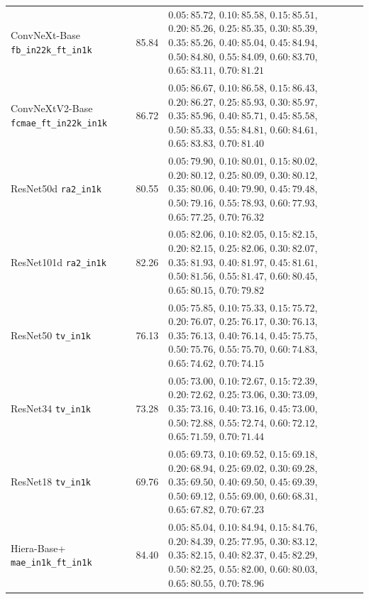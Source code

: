 \documentclass[11pt]{article}
\theoremstyle{plain}
\theoremstyle{definition}
\theoremstyle{remark}
\newcommand{\1}{\mathbf{1}}
\begin{document}
\begin{table}[ht]
\begin{tabularx}{\textwidth}{p{4.0cm}cX}
ConvNeXt-Base \texttt{fb\_in22k\_ft\_in1k}
& 85.84
& \(0.05:85.72\), \(0.10:85.58\), \(0.15:85.51\), \(0.20:85.26\), \(0.25:85.35\), \(0.30:85.39\), \(0.35:85.26\), \(0.40:85.04\), \(0.45:84.94\), \(0.50:84.80\), \(0.55:84.09\), \(0.60:83.70\), \(0.65:83.11\), \(0.70:81.21\) \\
ConvNeXtV2-Base \texttt{fcmae\_ft\_in22k\_in1k}
& 86.72
& \(0.05:86.67\), \(0.10:86.58\), \(0.15:86.43\), \(0.20:86.27\), \(0.25:85.93\), \(0.30:85.97\), \(0.35:85.96\), \(0.40:85.71\), \(0.45:85.58\), \(0.50:85.33\), \(0.55:84.81\), \(0.60:84.61\), \(0.65:83.83\), \(0.70:81.40\) \\
ResNet50d \texttt{ra2\_in1k}
& 80.55
& \(0.05:79.90\), \(0.10:80.01\), \(0.15:80.02\), \(0.20:80.12\), \(0.25:80.09\), \(0.30:80.12\), \(0.35:80.06\), \(0.40:79.90\), \(0.45:79.48\), \(0.50:79.16\), \(0.55:78.93\), \(0.60:77.93\), \(0.65:77.25\), \(0.70:76.32\) \\
ResNet101d \texttt{ra2\_in1k}
& 82.26
& \(0.05:82.06\), \(0.10:82.05\), \(0.15:82.15\), \(0.20:82.15\), \(0.25:82.06\), \(0.30:82.07\), \(0.35:81.93\), \(0.40:81.97\), \(0.45:81.61\), \(0.50:81.56\), \(0.55:81.47\), \(0.60:80.45\), \(0.65:80.15\), \(0.70:79.82\) \\
ResNet50 \texttt{tv\_in1k}
& 76.13
& \(0.05:75.85\), \(0.10:75.33\), \(0.15:75.72\), \(0.20:76.07\), \(0.25:76.17\), \(0.30:76.13\), \(0.35:76.13\), \(0.40:76.14\), \(0.45:75.75\), \(0.50:75.76\), \(0.55:75.70\), \(0.60:74.83\), \(0.65:74.62\), \(0.70:74.15\) \\
ResNet34 \texttt{tv\_in1k}
& 73.28
& \(0.05:73.00\), \(0.10:72.67\), \(0.15:72.39\), \(0.20:72.62\), \(0.25:73.06\), \(0.30:73.09\), \(0.35:73.16\), \(0.40:73.16\), \(0.45:73.00\), \(0.50:72.88\), \(0.55:72.74\), \(0.60:72.12\), \(0.65:71.59\), \(0.70:71.44\) \\
ResNet18 \texttt{tv\_in1k}
& 69.76
& \(0.05:69.73\), \(0.10:69.52\), \(0.15:69.18\), \(0.20:68.94\), \(0.25:69.02\), \(0.30:69.28\), \(0.35:69.50\), \(0.40:69.50\), \(0.45:69.39\), \(0.50:69.12\), \(0.55:69.00\), \(0.60:68.31\), \(0.65:67.82\), \(0.70:67.23\) \\
Hiera-Base+ \texttt{mae\_in1k\_ft\_in1k}
& 84.40
& \(0.05:85.04\), \(0.10:84.94\), \(0.15:84.76\), \(0.20:84.39\), \(0.25:77.95\), \(0.30:83.12\), \(0.35:82.15\), \(0.40:82.37\), \(0.45:82.29\), \(0.50:82.25\), \(0.55:82.00\), \(0.60:80.03\), \(0.65:80.55\), \(0.70:78.96\) \\
\bottomrule
\end{tabularx}
\end{table}
\end{document}
